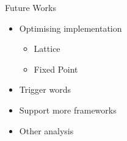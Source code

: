 \begin{frame}{Future Works}
  \begin{itemize}
  \item Optimising implementation
    \begin{itemize}
    \item Lattice
    \item Fixed Point
    \end{itemize}
  \item Trigger words
  \item Support more frameworks
  \item Other analysis
  \end{itemize}
\end{frame}
